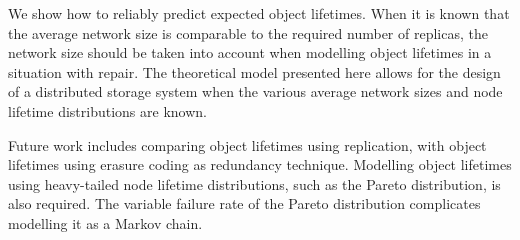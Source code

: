 We show how to reliably predict expected object lifetimes. When it is known that the average network size is comparable to the required number of replicas, the network size should be taken into account when modelling object lifetimes in a situation with repair. The theoretical model presented here allows for the design of a distributed storage system when the various average network sizes and node lifetime distributions are known.

Future work includes comparing object lifetimes using replication, with object lifetimes using erasure coding as redundancy technique. Modelling object lifetimes using heavy-tailed node lifetime distributions, such as the Pareto distribution, is also required. The variable failure rate of the Pareto distribution complicates modelling it as a Markov chain.
